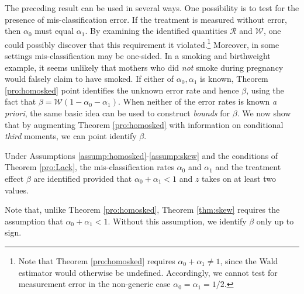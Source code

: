 The preceding result can be used in several ways.
One possibility is to test for the presence of mis-classification error.
If the treatment is measured without error, then $\alpha_0$ must equal $\alpha_1$.
By examining the identified quantities $\mathcal{R}$ and $\mathcal{W}$, one could possibly discover that this requirement it violated.\footnote{Note that Theorem \ref{pro:homosked} requires $\alpha_0 + \alpha_1 \neq 1$, since the Wald estimator would otherwise be undefined. Accordingly, we cannot test for measurement error in the non-generic case $\alpha_0 = \alpha_1 = 1/2$.}
Moreover, in some settings mis-classification may be one-sided.
In a smoking and birthweight example, it seems unlikely that mothers who did \emph{not} smoke during pregnancy would falsely claim to have smoked.
If either of $\alpha_0, \alpha_1$ is known, Theorem \ref{pro:homosked} point identifies the unknown error rate and hence $\beta$, using the fact that $\beta=\mathcal{W}(1-\alpha_0-\alpha_1)$.
When neither of the error rates is known \emph{a priori}, the same basic idea can be used to construct \emph{bounds} for $\beta$.
We now show that by augmenting Theorem \ref{pro:homosked} with information on conditional \emph{third} moments, we can point identify $\beta$.

\begin{thm}
  \label{thm:skew}
  Under Assumptions \ref{assump:homosked}-\ref{assump:skew} and the conditions of Theorem \ref{pro:Lack}, the mis-classification rates $\alpha_0$ and $\alpha_1$ and the treatment effect $\beta$ are identified provided that $\alpha_0 + \alpha_1 < 1$ and $z$ takes on at least two values.
\end{thm}


Note that, unlike Theorem \ref{pro:homosked}, Theorem \ref{thm:skew} requires the assumption that $\alpha_0 + \alpha_1 < 1$.
Without this assumption, we identify $\beta$ only up to sign.

